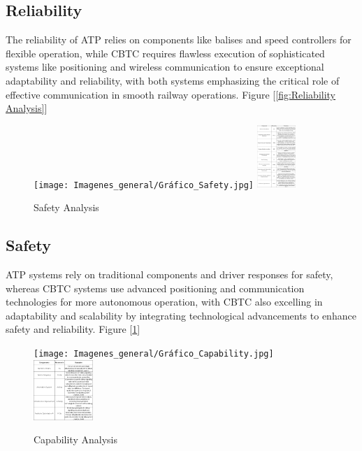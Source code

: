 \documentclass[conference]{IEEEtran}
\begin{document}
\subsection{Reliability}
The reliability of ATP relies on components like balises and speed controllers for flexible operation, while CBTC requires flawless execution of sophisticated systems like positioning and wireless communication to ensure exceptional adaptability and reliability, with both systems emphasizing the critical role of effective communication in smooth railway operations. Figure [\ref{fig:Reliability Analysis}]\\
\begin{figure}[h]
    \centering
    \texttt{[image: Imagenes\_general/Gráfico\_Safety.jpg]}
    \includegraphics[width=0.13\textwidth,scale=1]{Imagenes_general/Tabla_Safety.png}
    \caption{Safety Analysis}
    \label{fig:Safety Analysis}
\end{figure}
\subsection{Safety}
ATP systems rely on traditional components and driver responses for safety, whereas CBTC systems use advanced positioning and communication technologies for more autonomous operation, with CBTC also excelling in adaptability and scalability by integrating technological advancements to enhance safety and reliability. Figure [\ref{fig:Safety Analysis}]\\
\begin{figure}[ht]
    \centering
    \texttt{[image: Imagenes\_general/Gráfico\_Capability.jpg]}
    \includegraphics[width=0.20\textwidth,scale=1]{Imagenes_general/Tabla_Capability.png}
    \caption{Capability Analysis}
    \label{fig:Capability Analysis}
\end{figure}
\end{document}
